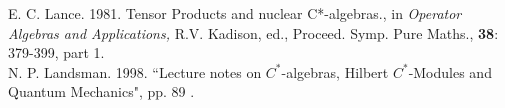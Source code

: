 \documentclass[12pt]{article}
\theoremstyle{plain}
\theoremstyle{definition}
\numberwithin{equation}{section}
\newcommand{\<}{{\langle}}
\begin{document}
\begin{thebibliography}{9}
E. C. Lance. 1981. Tensor Products and nuclear C*-algebras., in {\em Operator
Algebras and Applications,} R.V. Kadison, ed., Proceed. Symp. Pure Maths., \textbf{38}: 379-399, part 1.\\

N. P. Landsman. 1998. ``Lecture notes on $C^*$-algebras, Hilbert $C^*$-Modules and Quantum Mechanics", pp. 89
.

\end{thebibliography}


\end{document}
